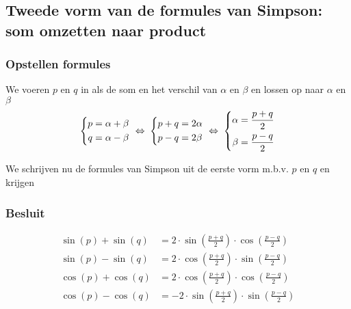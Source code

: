 \documentclass[a4paper,12pt]{article}
\begin{document}
\begin{theorie}

\newpage
\subsection{Tweede vorm van de formules van Simpson: som omzetten naar product}

\subsubsection*{Opstellen formules}

We voeren $p$ en $q$ in als de som en het verschil van $\alpha$ en $\beta$ en lossen op naar $\alpha$ en $\beta$
$$
  \left\{\begin{aligned}p&=\alpha+\beta\\q&=\alpha-\beta\end{aligned}\right.
  \;\Leftrightarrow\; \left\{\begin{aligned}p+q&=2\alpha\\p-q&=2\beta\end{aligned}\right.
  \;\Leftrightarrow\; \left\{\begin{aligned}\alpha&=\dfrac{p+q}{2}\\\beta&=\dfrac{p-q}{2}\end{aligned}\right.
$$

We schrijven nu de formules van Simpson uit de eerste vorm m.b.v. $p$ en $q$ en krijgen

\subsubsection*{Besluit}
\begin{align*}
  \sin(p)+\sin(q) &= 2\cdot \sin(\frac{p+q}{2})\cdot \cos(\frac{p-q}{2})\\
  \sin(p)-\sin(q) &= 2\cdot \cos(\frac{p+q}{2})\cdot \sin(\frac{p-q}{2})\\
  \cos(p)+\cos(q) &= 2\cdot \cos(\frac{p+q}{2})\cdot \cos(\frac{p-q}{2})\\
  \cos(p)-\cos(q) &= -2\cdot \sin(\frac{p+q}{2})\cdot \sin(\frac{p-q}{2})
\end{align*}


\end{theorie}
\end{document}
